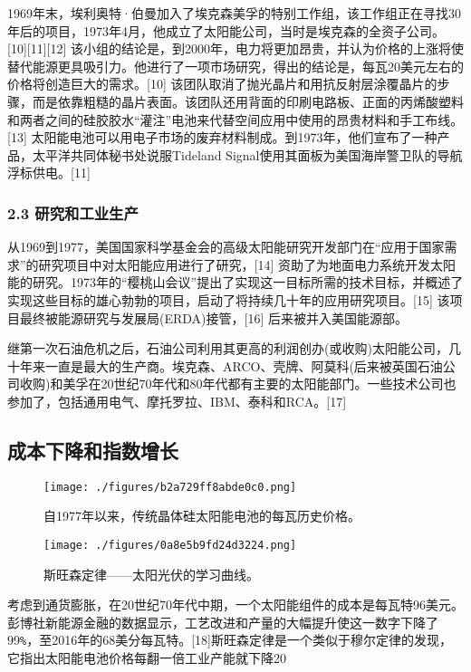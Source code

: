 1969年末，埃利奥特·伯曼加入了埃克森美孚的特别工作组，该工作组正在寻找30年后的项目，1973年4月，他成立了太阳能公司，当时是埃克森的全资子公司。[10][11][12] 该小组的结论是，到2000年，电力将更加昂贵，并认为价格的上涨将使替代能源更具吸引力。他进行了一项市场研究，得出的结论是，每瓦20美元左右的价格将创造巨大的需求。[10] 该团队取消了抛光晶片和用抗反射层涂覆晶片的步骤，而是依靠粗糙的晶片表面。该团队还用背面的印刷电路板、正面的丙烯酸塑料和两者之间的硅胶胶水“灌注”电池来代替空间应用中使用的昂贵材料和手工布线。[13] 太阳能电池可以用电子市场的废弃材料制成。到1973年，他们宣布了一种产品，太平洋共同体秘书处说服Tideland Signal使用其面板为美国海岸警卫队的导航浮标供电。[11]

\subsubsection{2.3 研究和工业生产}

从1969到1977，美国国家科学基金会的高级太阳能研究开发部门在“应用于国家需求”的研究项目中对太阳能应用进行了研究，[14] 资助了为地面电力系统开发太阳能的研究。1973年的“樱桃山会议”提出了实现这一目标所需的技术目标，并概述了实现这些目标的雄心勃勃的项目，启动了将持续几十年的应用研究项目。[15] 该项目最终被能源研究与发展局(ERDA)接管，[16] 后来被并入美国能源部。

继第一次石油危机之后，石油公司利用其更高的利润创办(或收购)太阳能公司，几十年来一直是最大的生产商。埃克森、ARCO、壳牌、阿莫科(后来被英国石油公司收购)和美孚在20世纪70年代和80年代都有主要的太阳能部门。一些技术公司也参加了，包括通用电气、摩托罗拉、IBM、泰科和RCA。[17]

\subsection{成本下降和指数增长}

\begin{figure}[ht]
\centering
\texttt{[image: ./figures/b2a729ff8abde0c0.png]}
\caption{自1977年以来，传统晶体硅太阳能电池的每瓦历史价格。} \label{fig_TYNDC_12}
\end{figure}

\begin{figure}[ht]
\centering
\texttt{[image: ./figures/0a8e5b9fd24d3224.png]}
\caption{斯旺森定律——太阳光伏的学习曲线。} \label{fig_TYNDC_13}
\end{figure}

考虑到通货膨胀，在20世纪70年代中期，一个太阳能组件的成本是每瓦特96美元。彭博社新能源金融的数据显示，工艺改进和产量的大幅提升使这一数字下降了99\verb`%`，至2016年的68美分每瓦特。[18]斯旺森定律是一个类似于穆尔定律的发现，它指出太阳能电池价格每翻一倍工业产能就下降20%

